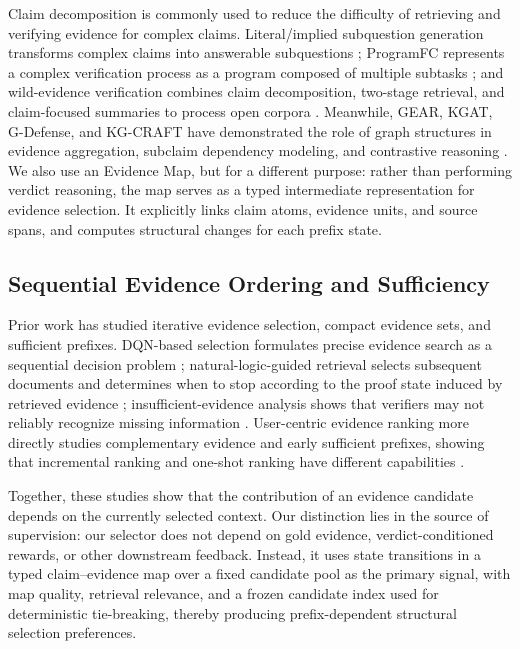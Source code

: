 \documentclass[letterpaper]{article}
\begin{document}
Claim decomposition is commonly used to reduce the difficulty of retrieving and verifying evidence for complex claims. Literal/implied subquestion generation transforms complex claims into answerable subquestions \citep{Chen2022ClaimDecomp}; ProgramFC represents a complex verification process as a program composed of multiple subtasks \citep{Pan2023ProgramFC}; and wild-evidence verification combines claim decomposition, two-stage retrieval, and claim-focused summaries to process open corpora \citep{Chen2023WildEvidence}. Meanwhile, GEAR, KGAT, G-Defense, and KG-CRAFT have demonstrated the role of graph structures in evidence aggregation, subclaim dependency modeling, and contrastive reasoning \citep{Zhou2019GEAR,Liu2019KGAT,Wang2026GDefense,Lourenco2026KGCRAFT}. We also use an Evidence Map, but for a different purpose: rather than performing verdict reasoning, the map serves as a typed intermediate representation for evidence selection. It explicitly links claim atoms, evidence units, and source spans, and computes structural changes for each prefix state.

\subsection{Sequential Evidence Ordering and Sufficiency}

Prior work has studied iterative evidence selection, compact evidence sets, and sufficient prefixes. DQN-based selection formulates precise evidence search as a sequential decision problem \citep{Wan2021DQN}; natural-logic-guided retrieval selects subsequent documents and determines when to stop according to the proof state induced by retrieved evidence \citep{Aly2022NaturalLogic}; insufficient-evidence analysis shows that verifiers may not reliably recognize missing information \citep{Atanasova2022Insufficient}. User-centric evidence ranking more directly studies complementary evidence and early sufficient prefixes, showing that incremental ranking and one-shot ranking have different capabilities \citep{Alt2026EvidenceRanking}.

Together, these studies show that the contribution of an evidence candidate depends on the currently selected context. Our distinction lies in the source of supervision: our selector does not depend on gold evidence, verdict-conditioned rewards, or other downstream feedback. Instead, it uses state transitions in a typed claim--evidence map over a fixed candidate pool as the primary signal, with map quality, retrieval relevance, and a frozen candidate index used for deterministic tie-breaking, thereby producing prefix-dependent structural selection preferences.
\end{document}

